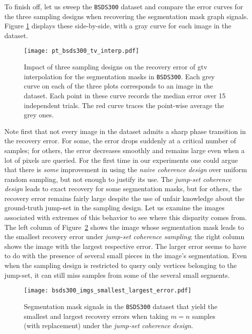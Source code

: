To finish off, let us sweep the \texttt{BSDS300} dataset and compare the error curves for the three sampling designs when recovering the segmentation mask graph signals. Figure \ref{fig:pt_bsds300_tv_interp} displays these side-by-side, with a gray curve for each image in the dataset.

\begin{figure}[H]
    \centering
    \texttt{[image: pt\_bsds300\_tv\_interp.pdf]}
    \caption[Three sampling designs: \texttt{BSDS300}]{Impact of three sampling designs on the recovery error of \acrshort{gtv} interpolation for the segmentation masks in \texttt{BSDS300}. Each grey curve on each of the three plots corresponds to an image in the dataset. Each point in these curve records the median error over 15 independent trials. The red curve traces the point-wise average the grey ones.}
    \label{fig:pt_bsds300_tv_interp}
\end{figure}

Note first that not every image in the dataset admits a sharp phase transition in the recovery error. For some, the error drops suddenly at a critical number of samples; for others, the error decreases smoothly and remains large even when a lot of pixels are queried. For the first time in our experiments one could argue that there is \emph{some} improvement in using the \emph{naive coherence design} over uniform random sampling, but not enough to justify its use. The \emph{jump-set coherence design} leads to exact recovery for some segmentation masks, but for others, the recovery error remains fairly large despite the use of unfair knowledge about the ground-truth jump-set in the sampling design. Let us examine the images associated with extremes of this behavior to see where this disparity comes from. The left column of Figure~\ref{fig:bsds300_imgs_smallest_largest_error} shows the image whose segmentation mask leads to the smallest recovery error under \emph{jump-set coherence sampling}; the right column shows the image with the largest respective error. The larger error seems to have to do with the presence of several small pieces in the image's segmentation. Even when the sampling design is restricted to query only vertices belonging to the jump-set, it can still miss samples from some of the several small segments.

\begin{figure}[H]
    \centering
    \texttt{[image: bsds300\_imgs\_smallest\_largest\_error.pdf]}
    \caption[Segmentation masks in \texttt{BSDS300} with the smallest and largest recovery errors]{Segmentation mask signals in the \texttt{BSDS300} dataset that yield the smallest and largest recovery errors when taking $m = n$ samples (with replacement) under the \emph{jump-set coherence design}.}
    \label{fig:bsds300_imgs_smallest_largest_error}
\end{figure}
\clearpage


